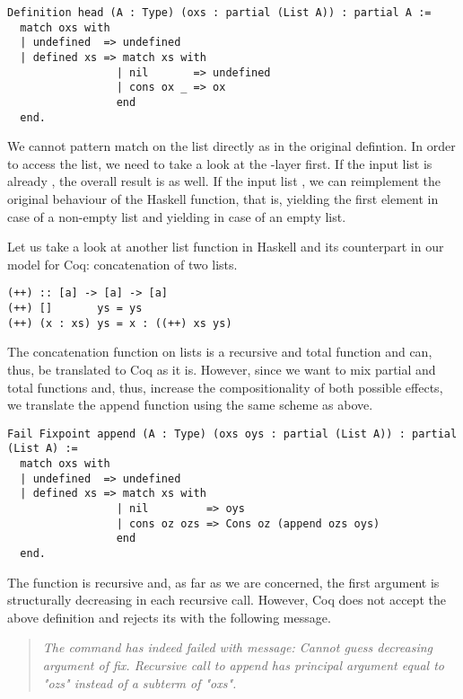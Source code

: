 \begin{verbatim}
Definition head (A : Type) (oxs : partial (List A)) : partial A :=
  match oxs with
  | undefined  => undefined
  | defined xs => match xs with
                 | nil       => undefined
                 | cons ox _ => ox
                 end
  end.
\end{verbatim}

We cannot pattern match on the list directly as in the original
defintion.
In order to access the list, we need to take a look at the
-layer first.
If the input list is already , the
overall result is  as well.
If the input list , we can reimplement the original
behaviour of the Haskell function, that is, yielding the first element
in case of a non-empty list and yielding  in case of
an empty list.

Let us take a look at another list function in Haskell and its
counterpart in our model for Coq: concatenation of two lists.

\begin{verbatim}
(++) :: [a] -> [a] -> [a]
(++) []       ys = ys
(++) (x : xs) ys = x : ((++) xs ys)
\end{verbatim}

The concatenation function on lists is a recursive and total function
and can, thus, be translated to Coq as it is.
However, since we want to mix partial and total functions and, thus,
increase the compositionality of both possible effects, we translate
the append function using the same scheme as above.

\begin{verbatim}
Fail Fixpoint append (A : Type) (oxs oys : partial (List A)) : partial (List A) :=
  match oxs with
  | undefined  => undefined
  | defined xs => match xs with
                 | nil         => oys
                 | cons oz ozs => Cons oz (append ozs oys)
                 end
  end.
\end{verbatim}

The function  is recursive and, as far as we
are concerned, the first argument is structurally decreasing in each
recursive call.
However, Coq does not accept the above definition and rejects its with
the following message.

\begin{quote}
\emph{The command has indeed failed with message: Cannot guess decreasing
argument of fix.
Recursive call to append has principal argument equal to "ozs" instead of a subterm of "oxs".}
\end{quote}

